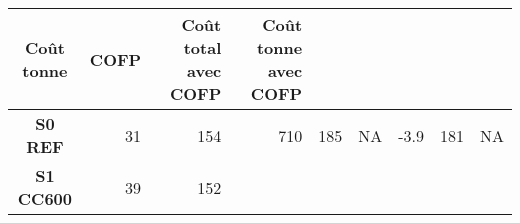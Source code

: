 \begin{longtable}[]{@{}crrrrrrrr@{}}
\begin{minipage}[b]{0.07\columnwidth}
Coût tonne\strut
\end{minipage} & \begin{minipage}[b]{0.04\columnwidth}\raggedleft\strut
COFP\strut
\end{minipage} & \begin{minipage}[b]{0.13\columnwidth}\raggedleft\strut
Coût total avec COFP\strut
\end{minipage} & \begin{minipage}[b]{0.13\columnwidth}\raggedleft\strut
Coût tonne avec COFP\strut
\end{minipage}\tabularnewline
\midrule
\endhead
\begin{minipage}[t]{0.10\columnwidth}\centering\strut
\textbf{S0 REF}\strut
\end{minipage} & \begin{minipage}[t]{0.09\columnwidth}\raggedleft\strut
31\strut
\end{minipage} & \begin{minipage}[t]{0.06\columnwidth}\raggedleft\strut
154\strut
\end{minipage} & \begin{minipage}[t]{0.06\columnwidth}\raggedleft\strut
710\strut
\end{minipage} & \begin{minipage}[t]{0.07\columnwidth}\raggedleft\strut
185\strut
\end{minipage} & \begin{minipage}[t]{0.07\columnwidth}\raggedleft\strut
NA\strut
\end{minipage} & \begin{minipage}[t]{0.04\columnwidth}\raggedleft\strut
-3.9\strut
\end{minipage} & \begin{minipage}[t]{0.13\columnwidth}\raggedleft\strut
181\strut
\end{minipage} & \begin{minipage}[t]{0.13\columnwidth}\raggedleft\strut
NA\strut
\end{minipage}\tabularnewline
\begin{minipage}[t]{0.10\columnwidth}\centering\strut
\textbf{S1 CC600}\strut
\end{minipage} & \begin{minipage}[t]{0.09\columnwidth}\raggedleft\strut
39\strut
\end{minipage} & \begin{minipage}[t]{0.06\columnwidth}\raggedleft\strut
152\strut
\end{minipage} & \begin{minipage}[t]{0.06\columnwidth}\raggedleft\strut

\end{minipage}
\end{longtable}
